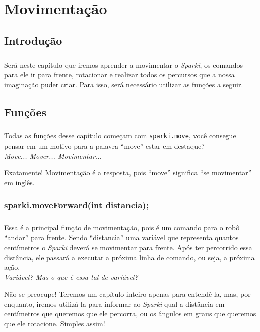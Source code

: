 \chapter{Movimentação}
\section*{Introdução}
    \paragraph{}
    Será neste capítulo que iremos aprender a movimentar o \textsl{Sparki}, os comandos para ele ir para frente, rotacionar e realizar todos os percursos que a nossa imaginação puder criar. Para isso, será necessário utilizar as funções a seguir.
    
\section{Funções}
    \paragraph{}
    Todas as funções desse capítulo começam com \lstinline[columns=fixed]{sparki.move}, você consegue pensar em um motivo para a palavra ``move'' estar em destaque?\\
    
    \textit{Move... Mover... Movimentar...} \par
    Exatamente! Movimentação é a resposta, pois ``move'' significa ``se movimentar'' em inglês.

\subsection{sparki.moveForward(int distancia);}
    \paragraph{}
    Essa é a principal função de movimentação, pois é um comando para o robô ``andar'' para frente. Sendo ``distancia'' uma variável que representa quantos centímetros o \textsl{Sparki} deverá se movimentar para frente. Após ter percorrido essa distância, ele passará a executar a próxima linha de comando, ou seja, a próxima ação.\\
    
    \textit{Variável? Mas o que é essa tal de variável?} \par
    Não se preocupe! Teremos um capítulo inteiro apenas para entendê-la, mas, por enquanto, iremos utilizá-la para informar ao \textsl{Sparki} qual a distância em centímetros que queremos que ele percorra, ou os ângulos em graus que queremos que ele rotacione. Simples assim!\\
    
